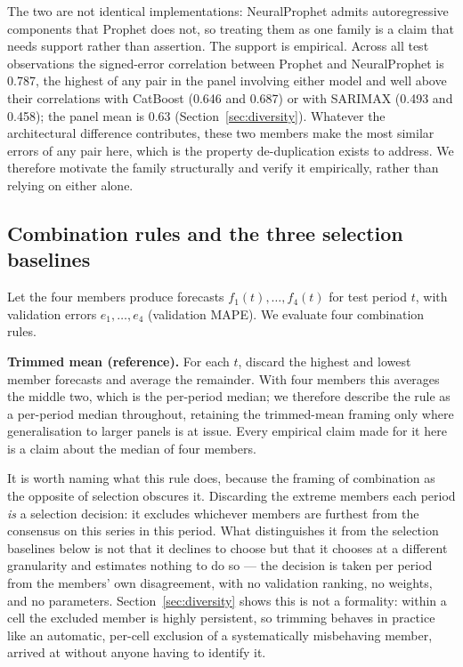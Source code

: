 \documentclass[11pt]{article}
\begin{document}
The two are not identical implementations: NeuralProphet admits autoregressive components that Prophet does not, so treating them as one family is a claim that needs support rather than assertion. The support is empirical. Across all test observations the signed-error correlation between Prophet and NeuralProphet is 0.787, the highest of any pair in the panel involving either model and well above their correlations with CatBoost (0.646 and 0.687) or with SARIMAX (0.493 and 0.458); the panel mean is 0.63 (Section~\ref{sec:diversity}). Whatever the architectural difference contributes, these two members make the most similar errors of any pair here, which is the property de-duplication exists to address. We therefore motivate the family structurally and verify it empirically, rather than relying on either alone.

\subsection{Combination rules and the three selection baselines}
\label{sec:rules}

Let the four members produce forecasts $f_1(t), \dots, f_4(t)$ for test period $t$, with validation errors $e_1, \dots, e_4$ (validation MAPE). We evaluate four combination rules.

\textbf{Trimmed mean (reference).} For each $t$, discard the highest and lowest member forecasts and average the remainder. With four members this averages the middle two, which is the per-period median; we therefore describe the rule as a per-period median throughout, retaining the trimmed-mean framing only where generalisation to larger panels is at issue. Every empirical claim made for it here is a claim about the median of four members.

It is worth naming what this rule does, because the framing of combination as the opposite of selection obscures it. Discarding the extreme members each period \emph{is} a selection decision: it excludes whichever members are furthest from the consensus on this series in this period. What distinguishes it from the selection baselines below is not that it declines to choose but that it chooses at a different granularity and estimates nothing to do so --- the decision is taken per period from the members' own disagreement, with no validation ranking, no weights, and no parameters. Section~\ref{sec:diversity} shows this is not a formality: within a cell the excluded member is highly persistent, so trimming behaves in practice like an automatic, per-cell exclusion of a systematically misbehaving member, arrived at without anyone having to identify it.
\end{document}
